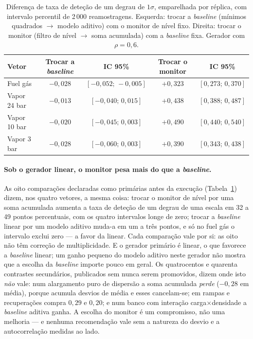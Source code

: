 \begin{table}[htbp]
  \centering
  \caption[Contrastes co-primários com verdade conhecida]{Diferença de taxa
  de deteção de um degrau de $1\sigma$, emparelhada por réplica, com intervalo
  percentil de 2\,000 reamostragens. Esquerda: trocar a \emph{baseline}
  (mínimos quadrados $\to$ modelo aditivo) com o monitor de nível fixo.
  Direita: trocar o monitor (filtro de nível $\to$ soma acumulada) com a
  \emph{baseline} fixa. Gerador com $\rho = 0{,}6$.}
  \label{tab:coprimarias}
  \begin{tabular}{lcccc}
    \toprule
    Vetor & Trocar a \emph{baseline} & IC 95\% & Trocar o monitor & IC 95\% \\
    \midrule
    Fuel gás     & $-0{,}028$ & $[-0{,}052;\,-0{,}005]$ & $+0{,}323$ & $[0{,}273;\,0{,}370]$ \\
    Vapor 24 bar & $-0{,}013$ & $[-0{,}040;\,0{,}015]$  & $+0{,}438$ & $[0{,}388;\,0{,}487]$ \\
    Vapor 10 bar & $-0{,}020$ & $[-0{,}045;\,0{,}003]$  & $+0{,}490$ & $[0{,}440;\,0{,}540]$ \\
    Vapor 3 bar  & $-0{,}028$ & $[-0{,}060;\,0{,}003]$  & $+0{,}390$ & $[0{,}343;\,0{,}438]$ \\
    \bottomrule
  \end{tabular}
\end{table}

\paragraph{Sob o gerador linear, o monitor pesa mais do que a
\emph{baseline}.} As oito comparações declaradas como primárias antes da
execução (Tabela~\ref{tab:coprimarias}) dizem, nos quatro vetores, a mesma
coisa: trocar o monitor de nível por uma soma acumulada aumenta a taxa de deteção
de um degrau de uma escala em 32 a 49 pontos percentuais, com os quatro
intervalos longe de zero; trocar a \emph{baseline} linear por um modelo
aditivo muda-a em um a três pontos, e só no fuel gás o intervalo exclui zero
--- a favor da linear. Cada comparação vale por si: as oito não têm correção
de multiplicidade. E o gerador primário é linear, o que favorece a
\emph{baseline} linear; um ganho pequeno do modelo aditivo neste gerador não
mostra que a escolha da \emph{baseline} importe pouco em geral. Os quatrocentos e quarenta contrastes secundários,
publicados sem nunca serem promovidos, dizem onde isto \emph{não} vale: num
alargamento puro de dispersão a soma acumulada \emph{perde} ($-0{,}28$ em
média), porque acumula desvios de média e esses cancelam-se; em rampas e
recuperações compra $0{,}29$ e $0{,}20$; e num banco com interação
carga$\times$densidade a \emph{baseline} aditiva ganha. A escolha do monitor
é um compromisso, não uma melhoria --- e nenhuma recomendação vale sem a
natureza do desvio e a autocorrelação medidas ao lado.

